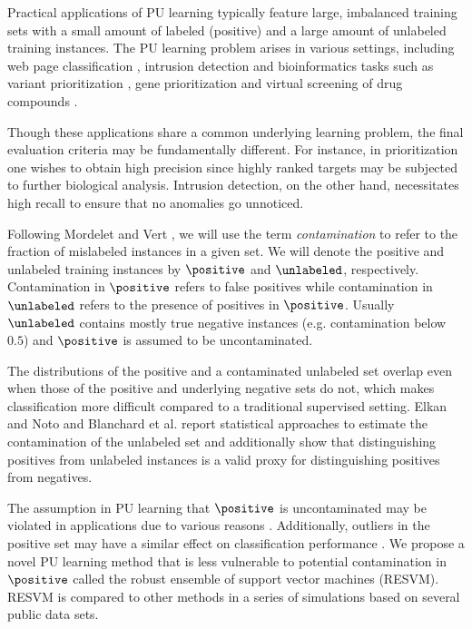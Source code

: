 Practical applications of PU learning typically feature large, imbalanced training sets with a small amount of labeled (positive) and a large amount of unlabeled training instances. The PU learning problem arises in various settings, including web page classification \citep{Yu02pebl:positive}, intrusion detection \citep{Lazarevic03acomparative} and bioinformatics tasks such as variant prioritization \citep{sifrim2013extasy}, gene prioritization \citep{citeulike:615632, mordelet2011prodige} and virtual screening of drug compounds \citep{citeulike:3911}. 

Though these applications share a common underlying learning problem, the final evaluation criteria may be fundamentally different. For instance, in  prioritization one wishes to obtain high precision since highly ranked targets may be subjected to further biological analysis. Intrusion detection, on the other hand, necessitates high recall to ensure that no anomalies go unnoticed.


Following Mordelet and Vert \citep{MORDELET-2010-523336}, we will use the term \emph{contamination} to refer to the fraction of mislabeled instances in a given set. We will denote the positive and unlabeled training instances by $\positive$ and $\unlabeled$, respectively. Contamination in $\positive$ refers to false positives while contamination in $\unlabeled$ refers to the presence of positives in $\positive$. Usually $\unlabeled$ contains mostly true negative instances (e.g. contamination below $0.5$) and $\positive$ is assumed to be uncontaminated. 

The distributions of the positive and a contaminated unlabeled set overlap even when those of the positive and underlying negative sets do not, which makes classification more difficult compared to a traditional supervised setting. Elkan and Noto \citep{Elkan:2008:LCO:1401890.1401920} and Blanchard et al. \citep{blanchard2010semi} report statistical approaches to estimate the contamination of the unlabeled set and additionally show that distinguishing positives from unlabeled instances is a valid proxy for distinguishing positives from negatives.


The assumption in PU learning that $\positive$ is uncontaminated may be violated in applications due to various reasons \citep{frenay}. Additionally, outliers in the positive set may have a similar effect on classification performance \citep{pechenizkiy2006class}. We propose a novel PU learning method that is less vulnerable to potential contamination in $\positive$ called the robust ensemble of support vector machines (RESVM). RESVM is compared to other methods in a series of simulations based on several public data sets.

